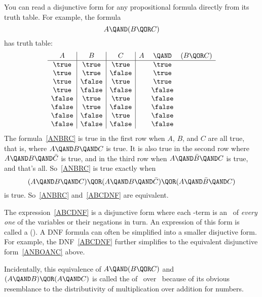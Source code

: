 You can read a disjunctive form for any propositional formula directly
from its truth table.  For example, the formula
\begin{equation}\label{ANBRC}
A \QAND (B \QOR C)
\end{equation}
has truth table:
\[\begin{array}{c|c|c|ccc}
A      & B      & C       & A & \QAND & (B \QOR C)\label{ANBRCTT}\\
\hline \true  & \true  & \true   &   &  \true\\
\true  & \true  & \false  &   &  \true\\
\true  & \false & \true   &   &  \true\\
\true  & \false & \false  &   &  \false\\
\false & \true  & \true   &   &  \false\\
\false & \true  & \false  &   &  \false\\
\false & \false & \true   &   &  \false\\
\false & \false & \false  &   &  \false
\end{array}\]
The formula~\eqref{ANBRC} is true in the first row when $A$, $B$, and
$C$ are all true, that is, where $A \QAND B \QAND C$ is true.  It is
also true in the second row where $A \QAND B \QAND \bar{C}$ is true,
and in the third row when $A \QAND \bar{B} \QAND C$ is true, and
that's all.  So~\eqref{ANBRC} is true exactly when
\begin{equation}\label{ABCDNF}
(A \QAND B \QAND C) \QOR (A \QAND B \QAND \bar{C}) \QOR
  (A \QAND \bar{B} \QAND C)
\end{equation}
is true.  So~\eqref{ANBRC} and~\eqref{ABCDNF} are equivalent.

The expression~\eqref{ABCDNF} is a disjunctive form where each
\QAND-term is an \QAND\ of \emph{every one} of the variables or
their negations in turn.  An expression of this form is called
a  ().  A DNF formula can
often be simplified into a smaller disjuctive form.  For example, the
DNF~\eqref{ABCDNF} further simplifies to the equivalent disjunctive
form~\eqref{ANBOANC} above.

Incidentally, this equivalence of $A \QAND (B \QOR C)$ and $(A \QAND
B) \QOR (A \QAND C)$ is called the  of \QAND\
over \QOR\ because of its obvious resemblance to the distributivity of
multiplication over addition for numbers.

